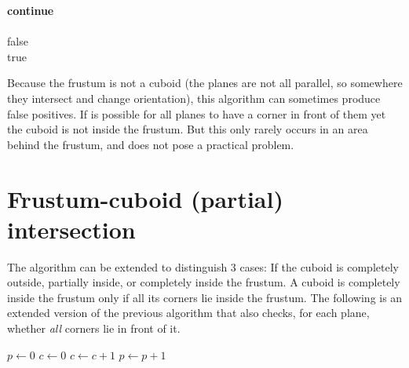 \documentclass[a4paper,10pt,abstracton,notitlepage]{scrreprt}
\begin{document}
\begin{algorithmic}
			 \textbf{continue} \\
			\EndIf
		\EndFor \\
		\Return false 
	\EndFor \\
	\Return true 
\end{algorithmic}

Because the frustum is not a cuboid (the planes are not all parallel, so somewhere they intersect and change orientation), this algorithm can sometimes produce false positives. If is possible for all planes to have a corner in front of them yet the cuboid is not inside the frustum. But this only rarely occurs in an area behind the frustum, and does not pose a practical problem.


\section{Frustum-cuboid (partial) intersection} \label{sec:fr_cub_inter}
The algorithm can be extended to distinguish 3 cases: If the cuboid is completely outside, partially inside, or completely inside the frustum. A cuboid is completely inside the frustum only if all its corners lie inside the frustum. The following is an extended version of the previous algorithm that also checks, for each plane, whether \emph{all} corners lie in front of it.

\begin{algorithmic}
	\State $p \gets 0$ 
		\State $c \gets 0$
				\State $c \gets c + 1$
			\EndIf
		\EndFor
			\State $p \gets p + 1$
		\EndIf
	\EndFor
	\Else
	\EndIf
\end{algorithmic}




\end{document}
